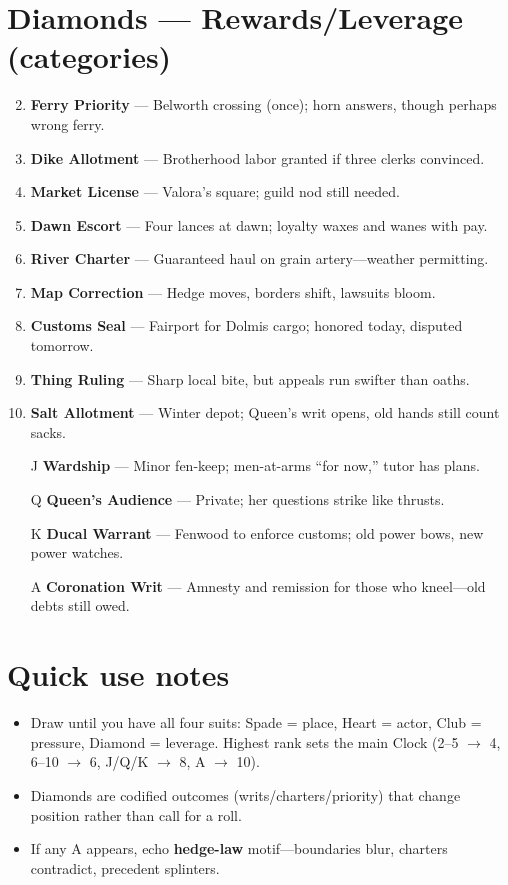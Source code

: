 \section*{Diamonds --- Rewards/Leverage (categories)}
\label{sec:viterra-rewards}
\begin{enumerate}
\setcounter{enumi}{1}
\item \textbf{Ferry Priority} --- Belworth crossing (once); horn answers, though perhaps wrong ferry.
\item \textbf{Dike Allotment} --- Brotherhood labor granted if three clerks convinced.
\item \textbf{Market License} --- Valora's square; guild nod still needed.
\item \textbf{Dawn Escort} --- Four lances at dawn; loyalty waxes and wanes with pay.
\item \textbf{River Charter} --- Guaranteed haul on grain artery—weather permitting.
\item \textbf{Map Correction} --- Hedge moves, borders shift, lawsuits bloom.
\item \textbf{Customs Seal} --- Fairport for Dolmis cargo; honored today, disputed tomorrow.
\item \textbf{Thing Ruling} --- Sharp local bite, but appeals run swifter than oaths.
\item \textbf{Salt Allotment} --- Winter depot; Queen's writ opens, old hands still count sacks.
\item[J] \textbf{Wardship} --- Minor fen-keep; men-at-arms ``for now,'' tutor has plans.
\item[Q] \textbf{Queen's Audience} --- Private; her questions strike like thrusts.
\item[K] \textbf{Ducal Warrant} --- Fenwood to enforce customs; old power bows, new power watches.
\item[A] \textbf{Coronation Writ} --- Amnesty and remission for those who kneel—old debts still owed.
\end{enumerate}

\section*{Quick use notes}
\label{sec:viterra-quick-use}
\begin{itemize}
\item Draw until you have all four suits: Spade = place, Heart = actor, Club = pressure, Diamond = leverage. Highest rank sets the main Clock (2--5 $\rightarrow$ 4, 6--10 $\rightarrow$ 6, J/Q/K $\rightarrow$ 8, A $\rightarrow$ 10).
\item Diamonds are codified outcomes (writs/charters/priority) that change position rather than call for a roll.
\item If any A appears, echo \textbf{hedge-law} motif—boundaries blur, charters contradict, precedent splinters.
\end{itemize}


